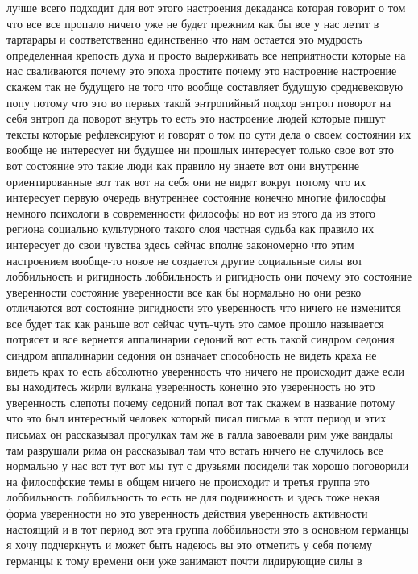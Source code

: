 лучше всего подходит для вот этого настроения декаданса которая говорит о том
что все все пропало ничего уже не будет прежним как бы все у нас летит в
тартарары и соответственно единственно что нам остается это мудрость
определенная крепость духа и просто выдерживать все неприятности которые на нас
сваливаются почему это эпоха простите почему это настроение настроение скажем
так не будущего не того что вообще составляет будущую средневековую попу потому
что это во первых такой энтропийный подход энтроп поворот на себя энтроп да
поворот внутрь то есть это настроение людей которые пишут тексты которые
рефлексируют и говорят о том по сути дела о своем состоянии их вообще не
интересует ни будущее ни прошлых интересует только свое вот это вот состояние
это такие люди как правило ну знаете вот они внутренне ориентированные вот так
вот на себя они не видят вокруг потому что их интересует первую очередь
внутреннее состояние конечно многие философы немного психологи в современности
философы но вот из этого да из этого региона социально культурного такого слоя
частная судьба как правило их интересует до свои чувства здесь сейчас вполне
закономерно что этим настроением вообще-то новое не создается другие социальные
силы вот лоббильность и ригидность лоббильность и ригидность они почему это
состояние уверенности состояние уверенности все как бы нормально но они резко
отличаются вот состояние ригидности это уверенность что ничего не изменится все
будет так как раньше вот сейчас чуть-чуть это самое прошло называется потрясет и
все вернется аппалинарии седоний вот есть такой синдром седония синдром
аппалинарии седония он означает способность не видеть краха не видеть крах то
есть абсолютно уверенность что ничего не происходит даже если вы находитесь
жирли вулкана уверенность конечно это уверенность но это уверенность слепоты
почему седоний попал вот так скажем в название потому что это был интересный
человек который писал письма в этот период и этих письмах он рассказывал
прогулках там же в галла завоевали рим уже вандалы там разрушали рима он
рассказывал там что встать ничего не случилось все нормально у нас вот тут вот
мы тут с друзьями посидели так хорошо поговорили на философские темы в общем
ничего не происходит и третья группа это лоббильность лоббильность то есть не
для подвижность и здесь тоже некая форма уверенности но это уверенность действия
уверенность активности настоящий и в тот период вот эта группа лоббильности это
в основном германцы я хочу подчеркнуть и может быть надеюсь вы это отметить у
себя почему германцы к тому времени они уже занимают почти лидирующие силы в
